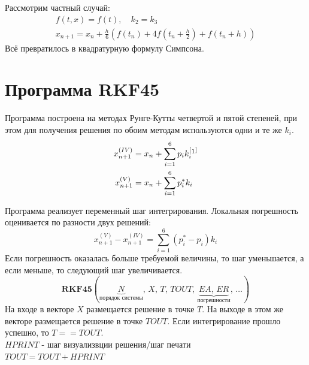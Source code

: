 \documentclass[a4paper,11pt]{article}
\begin{document}
\noindent Рассмотрим частный случай:
\begin{gather*}
  f(t, x) = f(t),\quad k_2 = k_3 \\
  x_{n+1} = x_n + \frac{h}{6}(f(t_n) + 4f(t_n+\frac{h}{2}) + f(t_n + h))
\end{gather*}
Всё превратилось в квадратурную формулу Симпсона.

\section{Программа RKF45}
Программа построена на методах Рунге-Кутты четвертой и пятой степеней, при этом для получения решения по обоим методам используются одни и те же $k_i$. \\
\begin{align*}
  x_{n+1}^{(IV)} &= x_n + \sum_{i=1}^6 p_i k_i ^[\footnotemark^] \\
  x_{n+1}^{(V)}  &= x_n + \sum_{i=1}^6 p_i^* k_i
\end{align*}

\noindent Программа реализует переменный шаг интегрирования. Локальная погрешность оценивается по разности двух решений:
\[x_{n+1}^{(V)} - x_{n+1}^{(IV)} = \sum_{i=1}^6 (p_i^* - p_i)k_i\]
Если погрешность оказалась больше требуемой величины, то шаг уменьшается, а если меньше, то следующий шаг увеличивается.\footnotemark
{}
\[\textbf{RKF45}(\underbrace{N}_{\text{порядок системы}},\, X,\, T,\, TOUT,\, \underbrace{EA,\, ER}_{\text{погрешности}},\, \dots)\]
На входе в векторе $X$ размещается решение в точке $T$. На выходе в этом же векторе размещается решение в точке $TOUT$. Если интегрирование прошло успешно,
  то $T == TOUT$. \\
  $HPRINT$ - шаг визуализвции решения/шаг печати \\
  $TOUT = TOUT + HPRINT$
\end{document}
